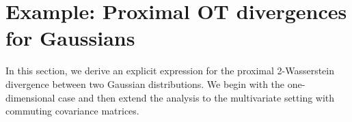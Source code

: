 \documentclass{amsart}
\theoremstyle{definition}
\theoremstyle{remark}
\numberwithin{equation}{section}
\begin{document}





\section{Example: Proximal OT divergences for Gaussians}
\label{sec:Gaussians}



In this section, we derive an explicit expression for the proximal 2-Wasserstein divergence between two Gaussian distributions. We begin with the one-dimensional case and then extend the analysis to the multivariate setting with commuting covariance matrices.
\end{document}

